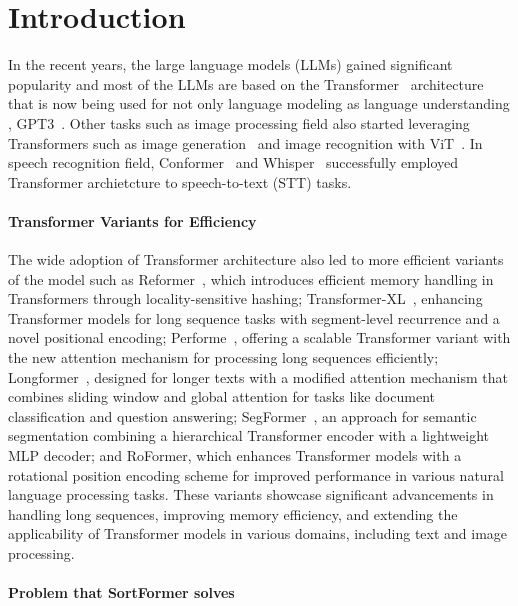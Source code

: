 \documentclass{article}
\begin{document}
\section{Introduction}

In the recent years, the large language models (LLMs) \cite{radford2019language, rao2022megatron} gained significant popularity and most of the LLMs are based on the Transformer~\cite{vaswani2017attention} architecture that is now being used for not only language modeling 
as language understanding \cite{devlin2018bert, raffel2019learning}, GPT3~\cite{brown2020gpt3}. Other tasks such as image processing field also started leveraging Transformers such as image generation~\cite{parmar2018image} and image recognition with ViT~\cite{dosovitskiy2020image}. In speech recognition field, Conformer~\cite{gulati2020conformer} and Whisper~\cite{radford2023robust} successfully employed Transformer archietcture to speech-to-text (STT) tasks. 

\paragraph{Transformer Variants for Efficiency}
The wide adoption of Transformer architecture also led to more efficient variants of the model such as Reformer~\cite{kitaev2019reformer}, which introduces efficient memory handling in Transformers through locality-sensitive hashing; Transformer-XL~\cite{dai2019transformer}, enhancing Transformer models for long sequence tasks with segment-level recurrence and a novel positional encoding; Performe~\cite{choromanski2020rethinking}, offering a scalable Transformer variant with the new attention mechanism for processing long sequences efficiently; Longformer~\cite{beltagy2020longformer}, designed for longer texts with a modified attention mechanism that combines sliding window and global attention for tasks like document classification and question answering; SegFormer~\cite{xie2021segformer}, an approach for semantic segmentation combining a hierarchical Transformer encoder with a lightweight MLP decoder; and RoFormer\cite{su2023roformer}, which enhances Transformer models with a rotational position encoding scheme for improved performance in various natural language processing tasks. These variants showcase significant advancements in handling long sequences, improving memory efficiency, and extending the applicability of Transformer models in various domains, including text and image processing.

\paragraph{Problem that SortFormer solves}
\end{document}
